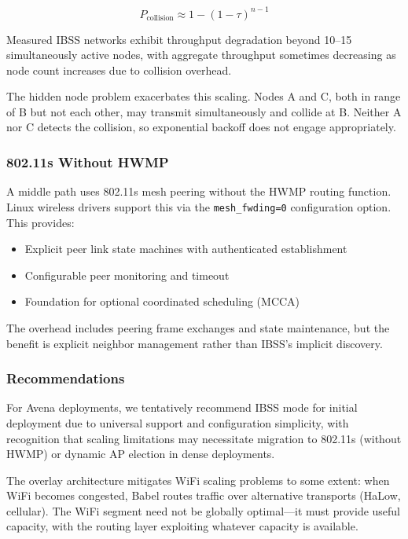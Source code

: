\[
P_{\text{collision}} \approx 1 - (1 - \tau)^{n-1}
\]

Measured IBSS networks exhibit throughput degradation beyond 10--15 simultaneously active nodes, with aggregate throughput sometimes decreasing as node count increases due to collision overhead.

The hidden node problem exacerbates this scaling. Nodes A and C, both in range of B but not each other, may transmit simultaneously and collide at B. Neither A nor C detects the collision, so exponential backoff does not engage appropriately.

\subsubsection{802.11s Without HWMP}

A middle path uses 802.11s mesh peering without the HWMP routing function. Linux wireless drivers support this via the \texttt{mesh\_fwding=0} configuration option. This provides:

\begin{itemize}[nosep]
    \item Explicit peer link state machines with authenticated establishment
    \item Configurable peer monitoring and timeout
    \item Foundation for optional coordinated scheduling (MCCA)
\end{itemize}

The overhead includes peering frame exchanges and state maintenance, but the benefit is explicit neighbor management rather than IBSS's implicit discovery.

\subsubsection{Recommendations}

For Avena deployments, we tentatively recommend IBSS mode for initial deployment due to universal support and configuration simplicity, with recognition that scaling limitations may necessitate migration to 802.11s (without HWMP) or dynamic AP election in dense deployments.

The overlay architecture mitigates WiFi scaling problems to some extent: when WiFi becomes congested, Babel routes traffic over alternative transports (HaLow, cellular). The WiFi segment need not be globally optimal---it must provide useful capacity, with the routing layer exploiting whatever capacity is available.
